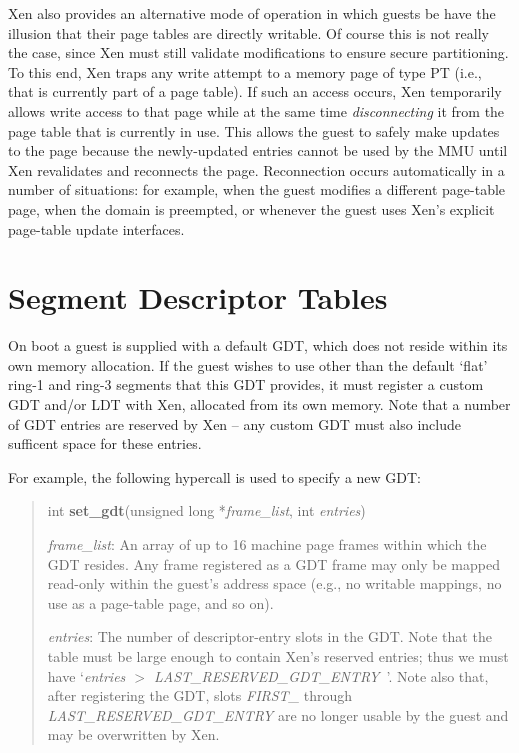 \documentclass[11pt,twoside,final,openright]{xenstyle}
\begin{document}

Xen also provides an alternative mode of operation in which guests be
have the illusion that their page tables are directly writable.  Of
course this is not really the case, since Xen must still validate
modifications to ensure secure partitioning. To this end, Xen traps
any write attempt to a memory page of type {\sf PT} (i.e., that is
currently part of a page table).  If such an access occurs, Xen
temporarily allows write access to that page while at the same time
{\em disconnecting} it from the page table that is currently in
use. This allows the guest to safely make updates to the page because
the newly-updated entries cannot be used by the MMU until Xen
revalidates and reconnects the page.
Reconnection occurs automatically in a number of situations: for
example, when the guest modifies a different page-table page, when the
domain is preempted, or whenever the guest uses Xen's explicit
page-table update interfaces.


\section{Segment Descriptor Tables}

On boot a guest is supplied with a default GDT, which does not reside
within its own memory allocation.  If the guest wishes to use other
than the default `flat' ring-1 and ring-3 segments that this GDT
provides, it must register a custom GDT and/or LDT with Xen,
allocated from its own memory. Note that a number of GDT 
entries are reserved by Xen -- any custom GDT must also include
sufficent space for these entries. 

For example, the following hypercall is used to specify a new GDT: 

\begin{quote}
int {\bf set\_gdt}(unsigned long *{\em frame\_list}, int {\em entries})

{\em frame\_list}: An array of up to 16 machine page frames within
which the GDT resides.  Any frame registered as a GDT frame may only
be mapped read-only within the guest's address space (e.g., no
writable mappings, no use as a page-table page, and so on).

{\em entries}: The number of descriptor-entry slots in the GDT.  Note
that the table must be large enough to contain Xen's reserved entries;
thus we must have `{\em entries $>$ LAST\_RESERVED\_GDT\_ENTRY}\ '.
Note also that, after registering the GDT, slots {\em FIRST\_} through
{\em LAST\_RESERVED\_GDT\_ENTRY} are no longer usable by the guest and
may be overwritten by Xen.
\end{quote}
\end{document}
